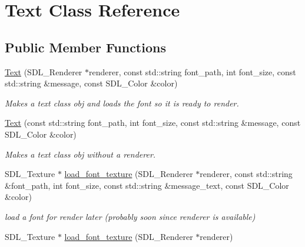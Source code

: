 \hypertarget{classText}{}\section{Text Class Reference}
\label{classText}
\subsection*{Public Member Functions}
\begin{DoxyCompactItemize}
\item 
\hyperlink{classText_a4c3d12cc306933ed7beec0cfde097331}{Text} (S\+D\+L\+\_\+\+Renderer $\ast$renderer, const std\+::string font\+\_\+path, int font\+\_\+size, const std\+::string \&message, const S\+D\+L\+\_\+\+Color \&color)\hypertarget{classText_a4c3d12cc306933ed7beec0cfde097331}{}\label{classText_a4c3d12cc306933ed7beec0cfde097331}

\begin{DoxyCompactList}\small\item\em Makes a text class obj and loads the font so it is ready to render. \end{DoxyCompactList}\item 
\hyperlink{classText_a9b6dd74fdea091ab8aa3c383cc20f472}{Text} (const std\+::string font\+\_\+path, int font\+\_\+size, const std\+::string \&message, const S\+D\+L\+\_\+\+Color \&color)\hypertarget{classText_a9b6dd74fdea091ab8aa3c383cc20f472}{}\label{classText_a9b6dd74fdea091ab8aa3c383cc20f472}

\begin{DoxyCompactList}\small\item\em Makes a text class obj without a renderer. \end{DoxyCompactList}\item 
S\+D\+L\+\_\+\+Texture $\ast$ \hyperlink{classText_acdb749d03d9c86af2ffd33bf7bd41a9a}{load\+\_\+font\+\_\+texture} (S\+D\+L\+\_\+\+Renderer $\ast$renderer, const std\+::string \&font\+\_\+path, int font\+\_\+size, const std\+::string \&message\+\_\+text, const S\+D\+L\+\_\+\+Color \&color)\hypertarget{classText_acdb749d03d9c86af2ffd33bf7bd41a9a}{}\label{classText_acdb749d03d9c86af2ffd33bf7bd41a9a}

\begin{DoxyCompactList}\small\item\em load a font for render later (probably soon since renderer is available) \end{DoxyCompactList}\item 
S\+D\+L\+\_\+\+Texture $\ast$ \hyperlink{classText_a9d0f322f73e6c23ba612d9fc64c94529}{load\+\_\+font\+\_\+texture} (S\+D\+L\+\_\+\+Renderer $\ast$renderer)\hypertarget{classText_a9d0f322f73e6c23ba612d9fc64c94529}{}\label{classText_a9d0f322f73e6c23ba612d9fc64c94529}


\end{DoxyCompactItemize}
